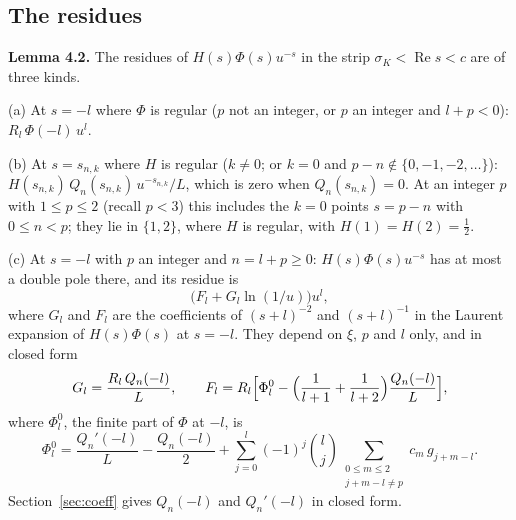 \documentclass[11pt]{article}
\newcommand{\re}{\operatorname{Re}}
\begin{document}
\subsection{The residues}

\noindent\textbf{Lemma 4.2.} The residues of $H(s)\Phi(s)u^{-s}$ in the strip $\sigma_K<\re s<c$ are of three kinds.

(a) At $s=-l$ where $\Phi$ is regular ($p$ not an integer, or $p$ an integer and $l+p<0$): $R_l\,\Phi(-l)\,u^l$.

(b) At $s=s_{n,k}$ where $H$ is regular ($k\ne0$; or $k=0$ and $p-n\notin\{0,-1,-2,\dots\}$): $H(s_{n,k})\,Q_n(s_{n,k})\,u^{-s_{n,k}}/L$, which is zero when $Q_n(s_{n,k})=0$. At an integer $p$ with $1\le p\le2$ (recall $p<3$) this includes the $k=0$ points $s=p-n$ with $0\le n<p$; they lie in $\{1,2\}$, where $H$ is regular, with $H(1)=H(2)=\frac12$.

(c) At $s=-l$ with $p$ an integer and $n=l+p\ge0$: $H(s)\Phi(s)u^{-s}$ has at most a double pole there, and its residue is
\[
\bigl(F_l+G_l\ln(1/u)\bigr)u^l,
\]
where $G_l$ and $F_l$ are the coefficients of $(s+l)^{-2}$ and $(s+l)^{-1}$ in the Laurent expansion of $H(s)\Phi(s)$ at $s=-l$. They depend on $\xi$, $p$ and $l$ only, and in closed form
\[
G_l=\frac{R_l\,Q_n(-l)}{L},\qquad F_l=R_l\Bigl[\Phi^0_l-\Bigl(\frac1{l+1}+\frac1{l+2}\Bigr)\frac{Q_n(-l)}{L}\Bigr],
\]
where $\Phi^0_l$, the finite part of $\Phi$ at $-l$, is
\[
\Phi^0_l=\frac{Q_n'(-l)}{L}-\frac{Q_n(-l)}{2}+\sum_{j=0}^{l}(-1)^j\binom{l}{j}\sum_{\substack{0\le m\le2\\ j+m-l\ne p}}c_m\,g_{j+m-l}.
\]
Section~\ref{sec:coeff} gives $Q_n(-l)$ and $Q_n'(-l)$ in closed form.
\end{document}

